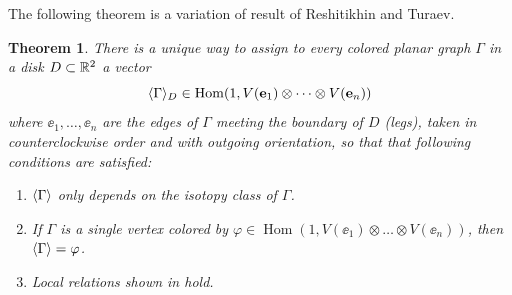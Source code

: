 \documentclass{amsart}
\newtheorem{thm}{Theorem}[section]
\DeclareMathOperator{\Hom}{Hom}
\newcommand{\one}{1}
\newcommand{\Ga}{\Gamma}
\newcommand{\ph}{\varphi}
\begin{document}
The following theorem is a variation of result of Reshitikhin and Turaev. 
\begin{thm}\label{t:RT}
  There is a unique  way to assign to every colored
  planar graph $\Ga$ in a disk $D\subset \mathbb{R}^2$ a vector
  \begin{equation}
    \<\Ga\>_D\in \Hom (\one, V(\ee_1) \otimes \dots \otimes V(\ee_n))
  \end{equation}
  where $\ee_1,\dots, \ee_n$ are the edges of $\Ga$ meeting the boundary
  of $D$ (legs), taken in counterclockwise order and with outgoing orientation,
  so that that following conditions are satisfied:
  \begin{enumerate}
     \item $\<\Ga\>$ only depends on the isotopy  class of $\Ga$.

    \item If $\Ga$ is a single vertex colored by
          $\ph\in \Hom (1, V(\ee_1) \otimes \dots \otimes V(\ee_n))$, then $\<\Ga\>=\ph$.
     
    \item Local relations shown in  hold. 



\end{enumerate}
\end{thm}
\end{document}
